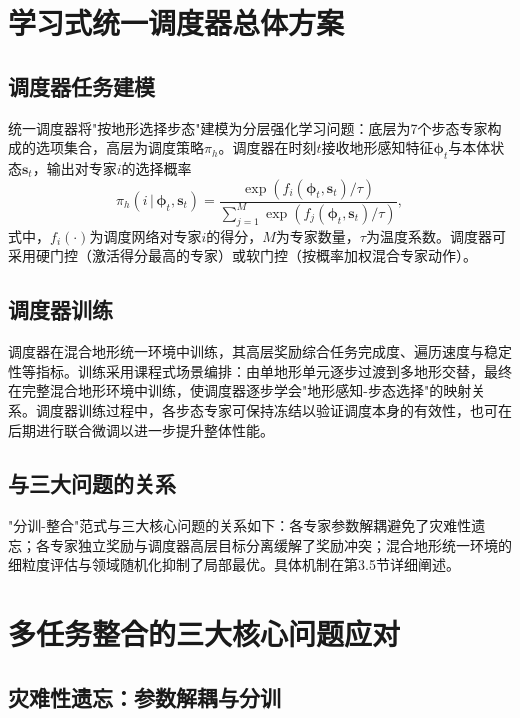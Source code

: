 \section{学习式统一调度器总体方案}

\subsection{调度器任务建模}

统一调度器将"按地形选择步态"建模为分层强化学习问题：底层为7个步态专家构成的选项集合，高层为调度策略$\pi_h$。调度器在时刻$t$接收地形感知特征$\boldsymbol{\phi}_t$与本体状态$\boldsymbol{s}_t$，输出对专家$i$的选择概率
\begin{equation}
  \pi_h(i\,|\,\boldsymbol{\phi}_t,\boldsymbol{s}_t) = \frac{\exp\left(f_i(\boldsymbol{\phi}_t,\boldsymbol{s}_t)/\tau\right)}{\sum_{j=1}^{M}\exp\left(f_j(\boldsymbol{\phi}_t,\boldsymbol{s}_t)/\tau\right)},
  \label{eq:scheduler}
\end{equation}
式中，$f_i(\cdot)$为调度网络对专家$i$的得分，$M$为专家数量，$\tau$为温度系数。调度器可采用硬门控（激活得分最高的专家）或软门控（按概率加权混合专家动作）。

\subsection{调度器训练}

调度器在混合地形统一环境中训练，其高层奖励综合任务完成度、遍历速度与稳定性等指标。训练采用课程式场景编排：由单地形单元逐步过渡到多地形交替，最终在完整混合地形环境中训练，使调度器逐步学会"地形感知-步态选择"的映射关系。调度器训练过程中，各步态专家可保持冻结以验证调度本身的有效性，也可在后期进行联合微调以进一步提升整体性能。

\subsection{与三大问题的关系}

"分训-整合"范式与三大核心问题的关系如下：各专家参数解耦避免了灾难性遗忘；各专家独立奖励与调度器高层目标分离缓解了奖励冲突；混合地形统一环境的细粒度评估与领域随机化抑制了局部最优。具体机制在第3.5节详细阐述。

\section{多任务整合的三大核心问题应对}

\subsection{灾难性遗忘：参数解耦与分训}

